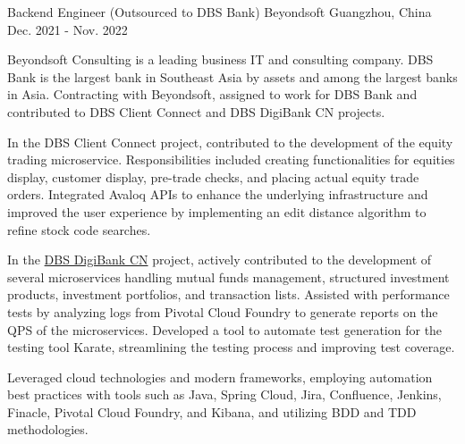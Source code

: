 \begin{cventries}
  \cventry
    {Backend Engineer (Outsourced to DBS Bank)} %
    {Beyondsoft} %
    {Guangzhou, China} %
    {Dec. 2021 - Nov. 2022} %
    {
      \begin{cvitems} %
        \item {Beyondsoft Consulting is a leading business IT and consulting company. DBS Bank is the largest bank in Southeast Asia by assets and among the largest banks in Asia. Contracting with Beyondsoft, assigned to work for DBS Bank and contributed to DBS Client Connect and DBS DigiBank CN projects.}
        \item {In the DBS Client Connect project, contributed to the development of the equity trading microservice. Responsibilities included creating functionalities for equities display, customer display, pre-trade checks, and placing actual equity trade orders. Integrated Avaloq APIs to enhance the underlying infrastructure and improved the user experience by implementing an edit distance algorithm to refine stock code searches.}
        \item {In the \href{https://www.dbs.com.cn/treasures/digital-service/digibank.html}{DBS DigiBank CN} project, actively contributed to the development of several microservices handling mutual funds management, structured investment products, investment portfolios, and transaction lists. Assisted with performance tests by analyzing logs from Pivotal Cloud Foundry to generate reports on the QPS of the microservices. Developed a tool to automate test generation for the testing tool Karate, streamlining the testing process and improving test coverage.}
        \item {Leveraged cloud technologies and modern frameworks, employing automation best practices with tools such as Java, Spring Cloud, Jira, Confluence, Jenkins, Finacle, Pivotal Cloud Foundry, and Kibana, and utilizing BDD and TDD methodologies.}
      \end{cvitems}
    }


\end{cventries}
